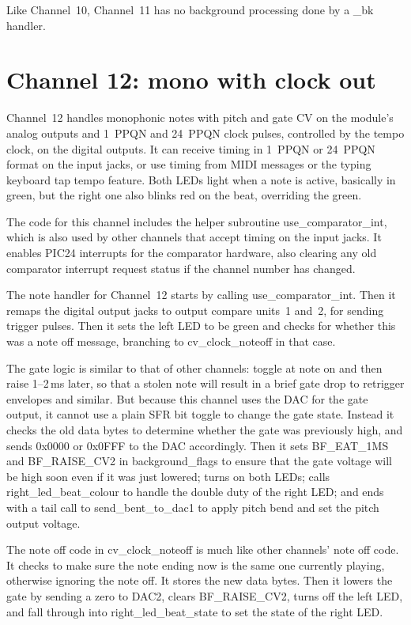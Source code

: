 Like Channel~10, Channel~11 has no background processing done by a \_bk
handler.

\section{Channel 12:  mono with clock out}

Channel~12 handles monophonic notes with pitch and gate CV on the module's
analog outputs and 1~PPQN and 24~PPQN clock pulses, controlled by the tempo
clock, on the digital outputs.  It can receive timing in 1~PPQN or 24~PPQN
format on the input jacks, or use timing from MIDI messages or the typing
keyboard tap tempo feature.  Both LEDs light when a note is active,
basically in green, but the right one also blinks red on the beat,
overriding the green.

The code for this channel includes the helper subroutine
use\_comparator\_int, which is also used by other channels that accept
timing on the input jacks.  It enables PIC24 interrupts for the comparator
hardware, also clearing any old comparator interrupt request status if the
channel number has changed.

The note handler for Channel~12 starts by calling use\_comparator\_int. 
Then it remaps the digital output jacks to output compare units~1 and~2, for
sending trigger pulses.  Then it sets the left LED to be green and checks
for whether this was a note off message, branching to cv\_clock\_noteoff in
that case.

The gate logic is similar to that of other channels:  toggle at note on and
then raise 1--2\,ms later, so that a stolen note will result in a brief gate
drop to retrigger envelopes and similar.  But because this channel uses the
DAC for the gate output, it cannot use a plain SFR bit toggle to change the
gate state.  Instead it checks the old data bytes to determine whether the
gate was previously high, and sends 0x0000 or 0x0FFF to the DAC accordingly. 
Then it sets BF\_EAT\_1MS and BF\_RAISE\_CV2 in background\_flags to ensure
that the gate voltage will be high soon even if it was just lowered; turns
on both LEDs; calls right\_led\_beat\_colour to handle the double duty of
the right LED; and ends with a tail call to send\_bent\_to\_dac1 to apply
pitch bend and set the pitch output voltage.

The note off code in cv\_clock\_noteoff is much like other channels' note
off code.  It checks to make sure the note ending now is the same one
currently playing, otherwise ignoring the note off.  It stores the new data
bytes.  Then it lowers the gate by sending a zero to DAC2, clears
BF\_RAISE\_CV2, turns off the left LED, and fall through into
right\_led\_beat\_state to set the state of the right LED.

